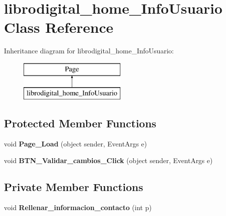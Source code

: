 \hypertarget{classlibrodigital__home___info_usuario}{}\section{librodigital\+\_\+home\+\_\+\+Info\+Usuario Class Reference}
\label{classlibrodigital__home___info_usuario}
Inheritance diagram for librodigital\+\_\+home\+\_\+\+Info\+Usuario\+:\begin{figure}[H]
\begin{center}
\leavevmode
\includegraphics[height=2.000000cm]{classlibrodigital__home___info_usuario}
\end{center}
\end{figure}
\subsection*{Protected Member Functions}
\begin{DoxyCompactItemize}
\item 
void {\bfseries Page\+\_\+\+Load} (object sender, Event\+Args e)\hypertarget{classlibrodigital__home___info_usuario_a7255cbc187e4f4fbaddaef058c7b82d3}{}\label{classlibrodigital__home___info_usuario_a7255cbc187e4f4fbaddaef058c7b82d3}

\item 
void {\bfseries B\+T\+N\+\_\+\+Validar\+\_\+cambios\+\_\+\+Click} (object sender, Event\+Args e)\hypertarget{classlibrodigital__home___info_usuario_ac933430cadf2e74a72579415e76ac6c2}{}\label{classlibrodigital__home___info_usuario_ac933430cadf2e74a72579415e76ac6c2}

\end{DoxyCompactItemize}
\subsection*{Private Member Functions}
\begin{DoxyCompactItemize}
\item 
void {\bfseries Rellenar\+\_\+informacion\+\_\+contacto} (int p)\hypertarget{classlibrodigital__home___info_usuario_a48a22ade05a2abbf23077bf31a2a491e}{}\label{classlibrodigital__home___info_usuario_a48a22ade05a2abbf23077bf31a2a491e}

\end{DoxyCompactItemize}
